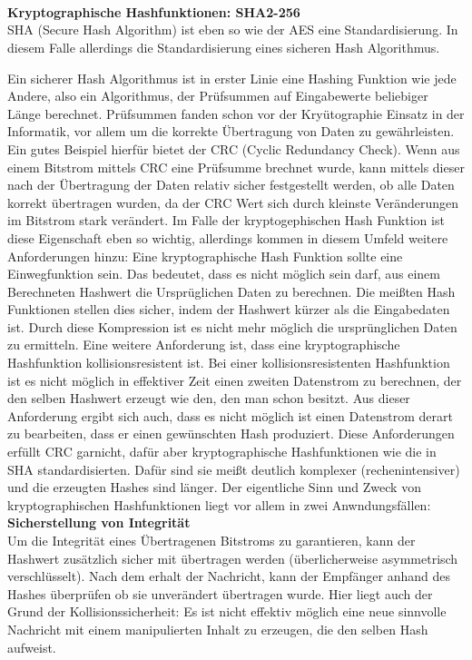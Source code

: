 \documentclass[12pt,a4paper,bibliography=totocnumbered,listof=totocnumbered]{scrartcl}
\begin{document}
\\\cite{6}\cite{7}\\
\\\textbf{Kryptographische Hashfunktionen: SHA2-256}\\
SHA (Secure Hash Algorithm) ist eben so wie der AES eine Standardisierung. In diesem Falle allerdings die Standardisierung eines sicheren Hash Algorithmus. 

Ein sicherer Hash Algorithmus ist in erster Linie eine Hashing Funktion wie jede Andere, also ein Algorithmus, der Prüfsummen auf Eingabewerte beliebiger Länge berechnet. Prüfsummen fanden schon vor der Kryütographie Einsatz in der Informatik, vor allem um die korrekte Übertragung von Daten zu gewährleisten. Ein gutes Beispiel hierfür bietet der CRC (Cyclic Redundancy Check). Wenn aus einem Bitstrom mittels CRC eine Prüfsumme brechnet wurde, kann mittels dieser nach der Übertragung der Daten relativ sicher festgestellt werden, ob alle Daten korrekt übertragen wurden, da der CRC Wert sich durch kleinste Veränderungen im Bitstrom stark verändert. Im Falle der kryptogephischen Hash Funktion ist diese Eigenschaft eben so wichtig, allerdings kommen  in diesem Umfeld weitere Anforderungen hinzu: Eine kryptographische Hash Funktion sollte eine Einwegfunktion sein. Das bedeutet, dass es nicht möglich sein darf, aus einem Berechneten Hashwert die Ursprüglichen Daten zu berechnen. Die meißten Hash Funktionen stellen dies sicher, indem der Hashwert kürzer als die Eingabedaten ist. Durch diese Kompression ist es nicht mehr möglich die ursprünglichen Daten zu ermitteln. Eine weitere Anforderung ist, dass eine kryptographische Hashfunktion kollisionsresistent ist. Bei einer kollisionsresistenten Hashfunktion ist es nicht möglich in effektiver Zeit einen zweiten Datenstrom zu berechnen, der den selben Hashwert erzeugt wie den, den man schon besitzt. Aus dieser Anforderung ergibt sich auch, dass es nicht möglich ist einen Datenstrom derart zu bearbeiten, dass er einen gewünschten Hash produziert. Diese Anforderungen erfüllt CRC garnicht, dafür aber kryptographische Hashfunktionen wie die in SHA standardisierten. Dafür sind sie meißt deutlich komplexer (rechenintensiver) und die erzeugten Hashes sind länger. Der eigentliche Sinn und Zweck von kryptographischen Hashfunktionen liegt vor allem in zwei Anwndungsfällen:
\\\textbf{Sicherstellung von Integrität}\\
Um die Integrität eines Übertragenen Bitstroms zu garantieren, kann der Hashwert zusätzlich sicher mit übertragen werden (überlicherweise asymmetrisch verschlüsselt). Nach dem erhalt der Nachricht, kann der Empfänger anhand des Hashes überprüfen ob sie unverändert übertragen wurde. Hier liegt auch der Grund der Kollisionssicherheit: Es ist nicht effektiv möglich eine neue sinnvolle Nachricht mit einem manipulierten Inhalt zu erzeugen, die den selben Hash aufweist.
\end{document}

